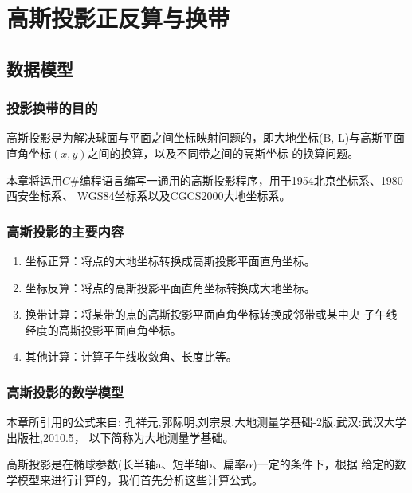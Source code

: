 
\chapter{高斯投影正反算与换带}
\section{数据模型}
\subsection{投影换带的目的}
高斯投影是为解决球面与平面之间坐标映射问题的，即大地坐标(B,
L)与高斯平面直角坐标$(x,y)$之间的换算，以及不同带之间的高斯坐标
的换算问题。

本章将运用$C\#$编程语言编写一通用的高斯投影程序，用于1954北京坐标系、1980西安坐标系、
WGS84坐标系以及CGCS2000大地坐标系。

\subsection{高斯投影的主要内容}
\begin{enumerate}
    \item 坐标正算：将点的大地坐标转换成高斯投影平面直角坐标。
    \item 坐标反算：将点的高斯投影平面直角坐标转换成大地坐标。
    \item 换带计算：将某带的点的高斯投影平面直角坐标转换成邻带或某中央
      子午线经度的高斯投影平面直角坐标。
    \item 其他计算：计算子午线收敛角、长度比等。
\end{enumerate}

\subsection{高斯投影的数学模型}

本章所引用的公式来自:
孔祥元,郭际明,刘宗泉.大地测量学基础-2版.武汉:武汉大学出版社,2010.5，
以下简称为大地测量学基础。

高斯投影是在椭球参数(长半轴a、短半轴b、扁率$\alpha$)一定的条件下，根据
给定的数学模型来进行计算的，我们首先分析这些计算公式。

